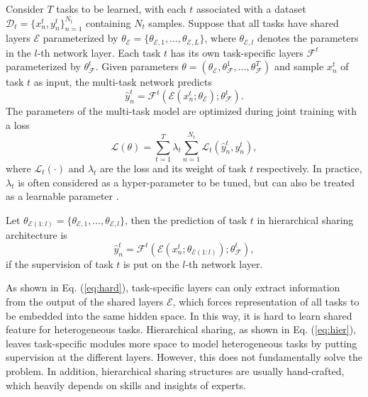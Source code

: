 \documentclass[letterpaper]{article} %
\begin{document}
Consider $T$ tasks to be learned, with each $t$ associated with a dataset $\mathcal{D}_t=\{x_n^{t}, y_n^{t}\}_{n=1}^{N_t}$ containing $N_t$ samples. Suppose that all tasks have shared layers $\mathcal{E}$ parameterized by $\theta_{\mathcal{E}}=\{\theta_{\mathcal{E}, 1},\dots,\theta_{\mathcal{E}, L}\}$, where $\theta_{\mathcal{E}, l}$ denotes the parameters in the $l$-th network layer. Each task $t$ has its own task-specific layers $\mathcal{F}^t$ parameterized by $\theta_{\mathcal{F}}^t$. Given parameters $\theta=(\theta_\mathcal{E}, \theta_{\mathcal{F}}^1, \dots, \theta_{\mathcal{F}}^T)$ and sample $x_n^t$ of task $t$ as input, the multi-task network predicts
\begin{equation}\label{eq:hard}
    \hat{y}_n^t = \mathcal{F}^t(\mathcal{E}(x_n^t; \theta_\mathcal{E}); \theta_\mathcal{F}^t).
\end{equation}
The parameters of the multi-task model are optimized during joint training with a loss
\begin{equation}
    \mathcal{L}(\theta) = \sum_{t=1}^T\lambda_t\sum_{n=1}^{N_t}\mathcal{L}_t(\hat{y}_n^t, y_n^t),
\end{equation}
where $\mathcal{L}_t(\cdot)$ and $\lambda_t$ are the loss and its weight of task $t$ respectively. In practice, $\lambda_t$ is often considered as a hyper-parameter to be tuned, but can also be treated as a learnable parameter \cite{DBLP:conf/cvpr/KendallGC18}.

Let $\theta_{\mathcal{E}(1:l)} = \{\theta_{\mathcal{E}, 1},\dots,\theta_{\mathcal{E}, l}\}$, then the prediction of task $t$ in hierarchical sharing architecture is
\begin{equation}\label{eq:hier}
    \hat{y}_n^t = \mathcal{F}^t(\mathcal{E}(x_n^t; \theta_{\mathcal{E}(1:l)}); \theta_\mathcal{F}^t),
\end{equation}
if the supervision of task $t$ is put on the $l$-th network layer.

As shown in Eq. (\ref{eq:hard}), task-specific layers can only extract information from the output of the shared layers $\mathcal{E}$, which forces representation of all tasks to be embedded into the same hidden space. In this way, it is hard to learn shared feature for heterogeneous tasks. Hierarchical sharing, as shown in Eq. (\ref{eq:hier}), leaves task-specific modules more space to model heterogeneous tasks by putting supervision at the different layers. However, this does not fundamentally solve the problem. In addition, hierarchical sharing structures are usually hand-crafted, which heavily depends on skills and insights of experts.
\end{document}
